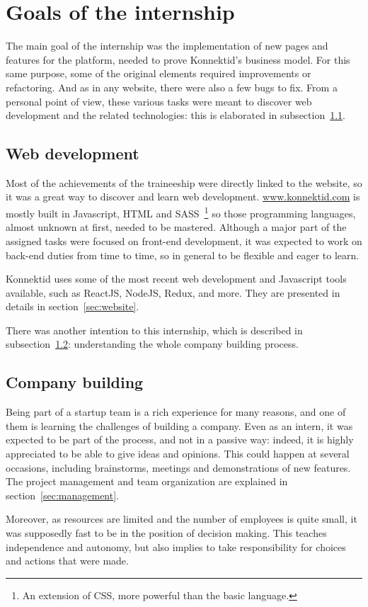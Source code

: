 \section{Goals of the internship}
\label{sec:goals}

The main goal of the internship was the implementation of new pages and features for the platform, needed to prove Konnektid's business model.
For this same purpose, some of the original elements required improvements or refactoring. And as in any website, there were also a few bugs to fix.
From a personal point of view, these various tasks were meant to discover web development and the related technologies: this is elaborated in {\sc subsection}~\ref{ssec:web}.

\subsection{Web development}
\label{ssec:web}

Most of the achievements of the traineeship were directly linked to the website, so it was a great way to discover and learn web development.
\url{www.konnektid.com} is mostly built in Javascript, HTML and SASS~\footnote{An extension of CSS, more powerful than the basic language.}
so those programming languages, almost unknown at first, needed to be mastered.
Although a major part of the assigned tasks were focused on front-end development,
it was expected to work on back-end duties from time to time, so in general to be flexible and eager to learn.

Konnektid uses some of the most recent web development and Javascript tools available, such as ReactJS, NodeJS, Redux, and more.
They are presented in details in {\sc section}~\ref{sec:website}.

There was another intention to this internship, which is described in {\sc subsection}~\ref{ssec:companyBuilding}:
understanding the whole company building process.

\subsection{Company building}
\label{ssec:companyBuilding}

Being part of a startup team is a rich experience for many reasons, and one of them is learning the challenges of building a company.
Even as an intern, it was expected to be part of the process, and not in a passive way:
indeed, it is highly appreciated to be able to give ideas and opinions.
This could happen at several occasions, including brainstorms, meetings and demonstrations of new features.
The project management and team organization are explained in {\sc section}~\ref{sec:management}.

Moreover, as resources are limited and the number of employees is quite small, it was supposedly fast to be in the position of decision making.
This teaches independence and autonomy, but also implies to take responsibility for choices and actions that were made.
